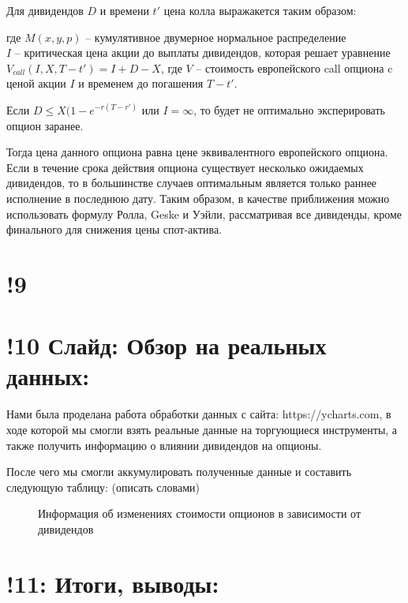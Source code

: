 \documentclass[a4paper]{article}
\begin{document}
Для дивидендов $D$ и времени $t'$ цена колла выражакется таким образом:

где $M(x,y,p)$ -- кумулятивное двумерное нормальное распределение \\
$I$ -- критическая цена акции до выплаты дивидендов, которая решает уравнение $V_{call} (I, X, T - t') = I + D - X$, где $V$ -- стоимость европейского call опциона c ценой акции $I$ и временем до погашения $T - t'$.

Если $D \leq X (1 - e ^{-r (T - r')}$ или $I = \infty$, то будет не оптимально эксперировать опцион заранее.

Тогда цена данного опциона равна цене эквивалентного европейского опциона. Если в течение срока действия опциона существует несколько ожидаемых дивидендов, то в большинстве случаев оптимальным является только раннее исполнение в последнюю дату. Таким образом, в качестве приближения можно использовать формулу Ролла, Geske и Уэйли, рассматривая все дивиденды, кроме финального для снижения цены спот-актива.
\section*{!9}
\section*{!10 Слайд: Обзор на реальных данных:}
Нами была проделана работа обработки данных с сайта: https://ycharts.com, в ходе которой мы смогли взять реальные данные на торгующиеся инструменты, а также получить информацию о влиянии дивидендов на опционы.

После чего мы смогли аккумулировать полученные данные и составить следующую таблицу: (описать словами)
\begin{figure}[h]
    \caption{Информация об изменениях стоимости опционов в зависимости от дивидендов}
    \label{fig:image}
\end{figure}

\section*{!11: Итоги, выводы:}
\end{document}
